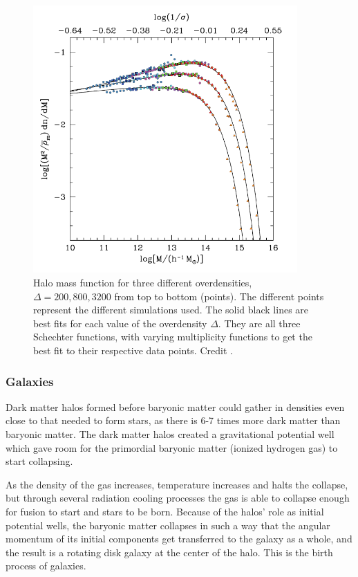 \begin{figure}
    \centering
    \includegraphics[width=0.9\textwidth]{images/halo_mass_function.png}
    \caption{Halo mass function for three different overdensities, $\Delta = 200, 800, 3200$ from top to bottom (points). The different points represent the different simulations used. The solid black lines are best fits for each value of the overdensity $\Delta$. They are all three Schechter functions, with varying multiplicity functions to get the best fit to their respective data points. Credit \textcite{Tinker2008}.}
    \label{halo_mass}
\end{figure}

\subsubsection{Galaxies}
Dark matter halos formed before baryonic matter could gather in densities even close to that needed to form stars, as there is 6-7 times more dark matter than baryonic matter. The dark matter halos created a gravitational potential well which gave room for the primordial baryonic matter (ionized hydrogen gas) to start collapsing. 

As the density of the gas increases, temperature increases and halts the collapse, but through several radiation cooling processes the gas is able to collapse enough for fusion to start and stars to be born. Because of the halos' role as initial potential wells, the baryonic matter collapses in such a way that the angular momentum of its initial components get transferred to the galaxy as a whole, and the result is a rotating disk galaxy at the center of the halo. This is the birth process of galaxies.

